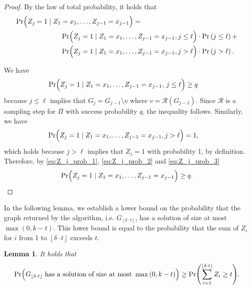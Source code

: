 \documentclass[letterpaper,11pt]{article}
\newcommand{\floor}[1]{ {\left\lfloor #1 \right\rfloor}}
\newcommand{\1}[1]{\mathds{1}\left[#1\right]}
\newtheorem{lemma}[theorem]{Lemma}
\begin{document}
\begin{proof}
	By the law of total probability, it holds that
	\begin{align}
		\Pr\Bigl( Z_j = 1 \mid Z_1 &= x_1, \ldots, Z_{j- 1}  = x_{j- 1}\Bigr) = \notag\\
				  &\Pr\Bigl( Z_j = 1 \mid Z_1 = x_1, \ldots, Z_{j- 1}  = x_{j- 1}, j \leq \ell\Bigr) \cdot \Pr\left(j \leq \ell\right) + \notag\\
				  &\Pr\Bigl( Z_j = 1 \mid Z_1 = x_1, \ldots, Z_{j- 1}  = x_{j- 1}, j > \ell\Bigr) \cdot \Pr\left(j > \ell\right).\label{eq:Z_j_prob_1}
	\end{align}

	We have
	\begin{align}
		\Pr\Bigl( &Z_j = 1 \mid Z_1 = x_1, \ldots, Z_{j- 1}  = x_{j- 1},\, j \leq \ell\Bigr)  \geq q\label{eq:Z_j_prob_2}
	\end{align}
	because $j \leq \ell$ implies that $G_{j} = G_{j - 1} \setminus v$ where $v = \mathcal{R}\left( G_{j - 1} \right)$. Since $\mathcal{R}$ is a sampling step for $\Pi$ with success probability $q$, the inequality follows.
	Similarly, we have
	\begin{align}
		\Pr\Bigl( &Z_j = 1 \mid Z_1 = x_1, \ldots, Z_{j- 1}  = x_{j- 1}, j > \ell\Bigr) = 1,\label{eq:Z_j_prob_3}  				
	\end{align}
	which holds because $j > \ell$ implies that $Z_j = 1$ with probability 1, by definition.
	Therefore, by \eqref{eq:Z_j_prob_1}, \eqref{eq:Z_j_prob_2} and \eqref{eq:Z_j_prob_3}
	\begin{equation*}
		\Pr\Bigl( Z_j = 1 \mid Z_1 = x_1, \ldots, Z_{j- 1}  = x_{j- 1}\Bigr) \geq q.
	\end{equation*}		
\end{proof}


In the following lemma, we establish a lower bound on the probability
that the graph returned by the algorithm, i.e. $G_{\floor{\delta \cdot t}}$,
has a solution of size at most $\max\left( 0, k - t \right)$.
This lower bound is equal to the probability that the sum of $Z_i$
for $i$ from 1 to $\floor{\delta \cdot t}$ exceeds $t$.

\begin{lemma}\label{lemma:pr_G_deltat_soln_lb}
	It holds that
	\begin{equation*}
		\Pr\Bigl( G_{\floor{\delta \cdot t}} \text{ has a solution of size at most } \max\left( 0, k - t \right)  \Bigr) \geq \Pr\Biggl(\sum_{i =1}^{\floor{\delta \cdot t}} Z_i \geq t\Biggr).
	\end{equation*}
\end{lemma}
\end{document}
